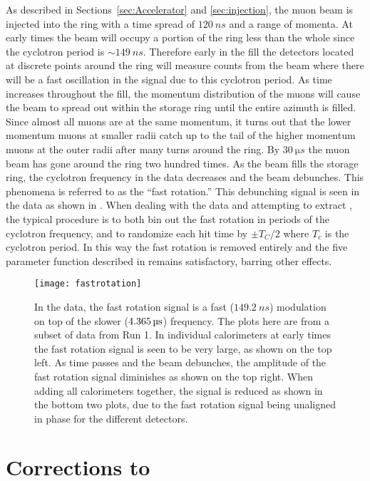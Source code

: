 As described in Sections~\ref{sec:Accelerator} and \ref{sec:injection}, the muon beam is injected into the ring with a time spread of $\SI{120}{ns}$ and a range of momenta. At early times the beam will occupy a portion of the ring less than the whole since the cyclotron period is $\sim\SI{149}{ns}$. Therefore early in the fill the detectors located at discrete points around the ring will measure counts from the beam where there will be a fast oscillation in the signal due to this cyclotron period. As time increases throughout the fill, the momentum distribution of the muons will cause the beam to spread out within the storage ring until the entire azimuth is filled. Since almost all muons are at the same momentum, it turns out that the lower momentum muons at smaller radii catch up to the tail of the higher momentum muons at the outer radii after many turns around the ring. By $\SI{30}{\micro s}$ the muon beam has gone around the ring two hundred times. As the beam fills the storage ring, the cyclotron frequency in the data decreases and the beam debunches. This phenomena is referred to as the ``fast rotation.'' This debunching signal is seen in the data as shown in . When dealing with the data and attempting to extract \wa, the typical procedure is to both bin out the fast rotation in periods of the cyclotron frequency, and to randomize each hit time by $\pm T_{C}/2$ where $T_{c}$ is the cyclotron period. In this way the fast rotation is removed entirely and the five parameter function described in  remains satisfactory, barring other effects.

\begin{figure}[]
    \centering
    \texttt{[image: fastrotation]}
    \caption[Beam debunching fast rotation]{In the data, the fast rotation signal is a fast ($\SI{149.2}{ns}$) modulation on top of the slower ($\SI{4.365}{\micro s}$) \wa frequency. The plots here are from a subset of data from Run 1. In individual calorimeters at early times the fast rotation signal is seen to be very large, as shown on the top left. As time passes and the beam debunches, the amplitude of the fast rotation signal diminishes as shown on the top right. When adding all calorimeters together, the signal is reduced as shown in the bottom two plots, due to the fast rotation signal being unaligned in phase for the different detectors.}
    \label{fig:fastrotation}
\end{figure}



\section{Corrections to \texorpdfstring{\wa}{wa}}

